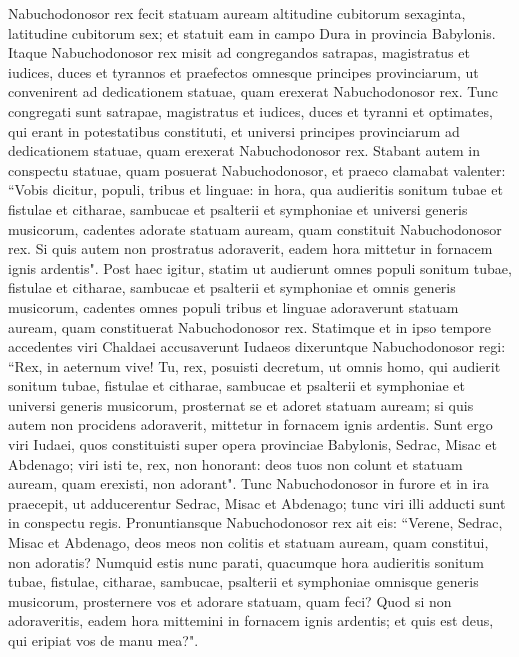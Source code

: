 \begin{biblechapter}  
\verse Nabuchodonosor rex fecit statuam auream altitudine cubitorum sexaginta, latitudine cubitorum sex; et statuit eam in campo Dura in provincia Babylonis.  
\verse Itaque Nabuchodonosor rex misit ad congregandos satrapas, magistratus et iudices, duces et tyrannos et praefectos omnesque principes provinciarum, ut convenirent ad dedicationem statuae, quam erexerat Nabuchodonosor rex. 
\verse Tunc congregati sunt satrapae, magistratus et iudices, duces et tyranni et optimates, qui erant in potestatibus constituti, et universi principes provinciarum ad dedicationem statuae, quam erexerat Nabuchodonosor rex. Stabant autem in conspectu statuae, quam posuerat Nabuchodonosor, 
\verse et praeco clamabat valenter: “Vobis dicitur, populi, tribus et linguae: 
\verse in hora, qua audieritis sonitum tubae et fistulae et citharae, sambucae et psalterii et symphoniae et universi generis musicorum, cadentes adorate statuam auream, quam constituit Nabuchodonosor rex. 
\verse Si quis autem non prostratus adoraverit, eadem hora mittetur in fornacem ignis ardentis". 
\verse Post haec igitur, statim ut audierunt omnes populi sonitum tubae, fistulae et citharae, sambucae et psalterii et symphoniae et omnis generis musicorum, cadentes omnes populi tribus et linguae adoraverunt statuam auream, quam constituerat Nabuchodonosor rex. 
\verse Statimque et in ipso tempore accedentes viri Chaldaei accusaverunt Iudaeos  
\verse dixeruntque Nabuchodonosor regi: “Rex, in aeternum vive! 
\verse Tu, rex, posuisti decretum, ut omnis homo, qui audierit sonitum tubae, fistulae et citharae, sambucae et psalterii et symphoniae et universi generis musicorum, prosternat se et adoret statuam auream; 
\verse si quis autem non procidens adoraverit, mittetur in fornacem ignis ardentis. 
\verse Sunt ergo viri Iudaei, quos constituisti super opera provinciae Babylonis, Sedrac, Misac et Abdenago; viri isti te, rex, non honorant: deos tuos non colunt et statuam auream, quam erexisti, non adorant". 
\verse Tunc Nabuchodonosor in furore et in ira praecepit, ut adducerentur Sedrac, Misac et Abdenago; tunc viri illi adducti sunt in conspectu regis. 
\verse Pronuntiansque Nabuchodonosor rex ait eis: “Verene, Sedrac, Misac et Abdenago, deos meos non colitis et statuam auream, quam constitui, non adoratis? 
\verse Numquid estis nunc parati, quacumque hora audieritis sonitum tubae, fistulae, citharae, sambucae, psalterii et symphoniae omnisque generis musicorum, prosternere vos et adorare statuam, quam feci? Quod si non adoraveritis, eadem hora mittemini in fornacem ignis ardentis; et quis est deus, qui eripiat vos de manu mea?". 

\end{biblechapter}
